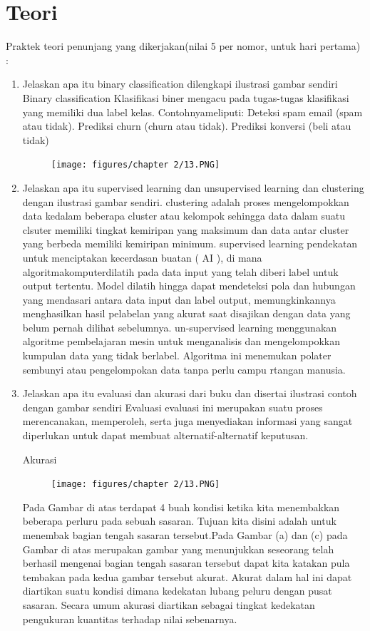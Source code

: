 \section{Teori}
Praktek teori penunjang yang dikerjakan(nilai 5 per nomor, untuk hari pertama) :
\begin{enumerate}
\item
Jelaskan apa itu binary classification dilengkapi ilustrasi gambar sendiri
Binary classification
Klasifikasi biner mengacu pada tugas-tugas klasifikasi yang memiliki dua label kelas.
Contohnyameliputi:
Deteksi spam email (spam atau tidak).
Prediksi churn (churn atau tidak).
Prediksi konversi (beli atau tidak)
\begin{figure}[!htbp]
	\centering
	\texttt{[image: figures/chapter 2/13.PNG]}
\end{figure}

\item
Jelaskan apa itu supervised learning dan unsupervised learning dan clustering dengan ilustrasi gambar sendiri.
clustering 
adalah proses mengelompokkan data kedalam beberapa cluster atau kelompok sehingga data dalam suatu clsuter memiliki tingkat kemiripan yang maksimum dan data antar cluster yang berbeda memiliki kemiripan minimum.
supervised learning
pendekatan untuk menciptakan kecerdasan buatan ( AI ), di mana algoritmakomputerdilatih pada data input yang telah diberi label untuk output tertentu. Model dilatih hingga dapat mendeteksi pola dan hubungan yang mendasari antara data input dan label output, memungkinkannya menghasilkan hasil pelabelan yang akurat saat disajikan dengan data yang belum pernah dilihat sebelumnya.
un-supervised learning
menggunakan algoritme pembelajaran mesin untuk menganalisis dan mengelompokkan kumpulan data yang tidak berlabel. Algoritma ini menemukan polater sembunyi atau pengelompokan data tanpa perlu campu rtangan manusia.

\item
Jelaskan apa itu evaluasi dan akurasi dari buku dan disertai ilustrasi contoh dengan gambar sendiri
Evaluasi 
evaluasi ini merupakan suatu proses merencanakan, memperoleh, serta juga menyediakan informasi yang sangat diperlukan untuk dapat membuat alternatif-alternatif keputusan.

Akurasi 
\begin{figure}[!htbp]
	\centering
	\texttt{[image: figures/chapter 2/13.PNG]}
\end{figure}
 

Pada Gambar di atas terdapat 4 buah kondisi ketika kita menembakkan beberapa perluru pada sebuah sasaran. Tujuan kita disini adalah untuk menembak bagian tengah sasaran tersebut.Pada Gambar (a) dan (c) pada Gambar di atas merupakan gambar yang menunjukkan seseorang telah berhasil mengenai bagian tengah sasaran tersebut dapat kita katakan pula tembakan pada kedua gambar tersebut akurat. Akurat dalam hal ini dapat diartikan suatu kondisi dimana kedekatan lubang peluru dengan pusat sasaran. Secara umum akurasi diartikan sebagai tingkat kedekatan pengukuran kuantitas terhadap nilai sebenarnya.


\end{enumerate}

